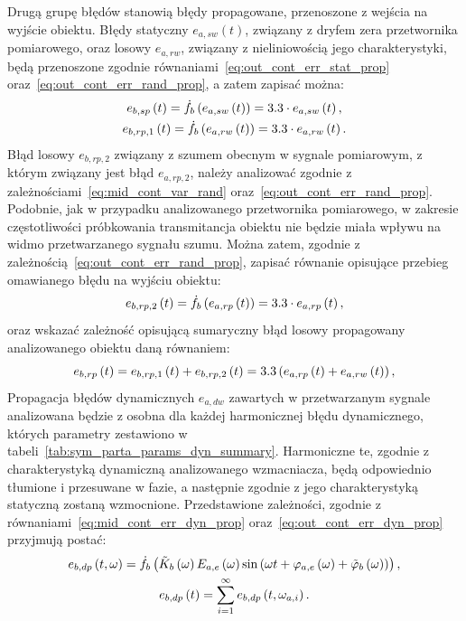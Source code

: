 Drugą grupę błędów stanowią błędy propagowane, przenoszone z wejścia na wyjście obiektu. Błędy statyczny $e_{a,sw}(t)$, związany z dryfem zera przetwornika pomiarowego, oraz losowy $e_{a,rw}$, związany z nieliniowością jego charakterystyki, będą przenoszone zgodnie równaniami~\eqref{eq:out_cont_err_stat_prop} oraz~\eqref{eq:out_cont_err_rand_prop}, a zatem zapisać można:
\begin{gather}
e_{b,sp} \left(t\right) = \dot{f}_{b} \left( e_{a,sw} \left(t\right) \right) = 3.3 \cdot e_{a,sw} \left(t\right) \label{eq:sym_partb_stat_prop_err}, \\
e_{b,rp,1} \left(t\right) = \dot{f}_{b} \left( e_{a,rw} \left(t\right) \right) = 3.3 \cdot e_{a,rw} \left(t\right) \label{eq:sym_partb_rand_prop_err_1}.
\end{gather}
Błąd losowy $e_{b,rp,2}$ związany z szumem obecnym w sygnale pomiarowym, z którym związany jest błąd $e_{a,rp,2}$, należy analizować zgodnie z zależnościami~\eqref{eq:mid_cont_var_rand} oraz~\eqref{eq:out_cont_err_rand_prop}. Podobnie, jak w przypadku analizowanego przetwornika pomiarowego, w zakresie częstotliwości próbkowania transmitancja obiektu nie będzie miała wpływu na widmo przetwarzanego sygnału szumu. Można zatem, zgodnie z zależnością~\eqref{eq:out_cont_err_rand_prop}, zapisać równanie opisujące przebieg omawianego błędu na wyjściu obiektu:
\begin{equation}
e_{b,rp,2} \left(t\right) = \dot{f}_{b} \left( e_{a,rp} \left(t\right) \right) = 3.3 \cdot e_{a,rp} \left(t\right) \label{eq:sym_partb_rand_prop_err_2},
\end{equation}
oraz wskazać zależność opisującą sumaryczny błąd losowy propagowany analizowanego obiektu daną równaniem:
\begin{equation}
e_{b,rp} \left(t\right) = e_{b,rp,1} \left(t\right) + e_{b,rp,2} \left(t\right) = 3.3 \left( e_{a,rp} \left(t\right) + e_{a,rw} \left(t\right) \right) \label{eq:sym_partb_rand_prop_err},
\end{equation}
Propagacja błędów dynamicznych $e_{a,dw}$ zawartych w przetwarzanym sygnale analizowana będzie z osobna dla każdej harmonicznej błędu dynamicznego, których parametry zestawiono w tabeli~\ref{tab:sym_parta_params_dyn_summary}. Harmoniczne te, zgodnie z charakterystyką dynamiczną analizowanego wzmacniacza, będą odpowiednio tłumione i przesuwane w fazie, a następnie zgodnie z jego charakterystyką statyczną zostaną wzmocnione. Przedstawione zależności, zgodnie z równaniami~\eqref{eq:mid_cont_err_dyn_prop} oraz~\eqref{eq:out_cont_err_dyn_prop} przyjmują postać:
\begin{gather}
e_{b,dp} \left(t,\omega\right) = \dot{f}_{b} \left( \tilde{K}_{b} \left(\omega\right) E_{a,e} \left(\omega\right) \sin \left( \omega t + \varphi_{a,e} \left(\omega\right) + \tilde{\varphi}_{b} \left(\omega\right) \right) \right) \label{eq:sym_partb_dyn_prop_err},\\
e_{b,dp} \left(t\right) = \sum _{i = 1} ^{\infty} e_{b,dp} \left(t,\omega_{a,i}\right) \label{eq:sym_partb_dyn_prop_sum}.
\end{gather}

